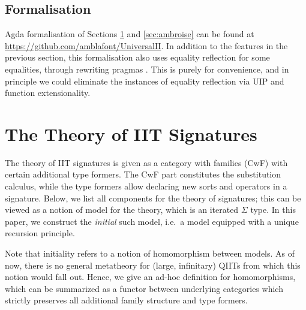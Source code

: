 \documentclass[a4paper,UKenglish,cleveref, autoref]{lipics-v2019}
\begin{document}
\subsection{Formalisation}

Agda formalisation of Sections \ref{sec:theory_of_signatures} and
\ref{sec:ambroise} can be found at
\url{https://github.com/amblafont/UniversalII}. In addition to the features in
the previous section, this formalisation also uses equality reflection for some
equalities, through rewriting pragmas \cite{cockxsprinkles}. This is purely for
convenience, and in principle we could eliminate the instances of equality
reflection via UIP and function extensionality.

\section{The Theory of IIT Signatures}
\label{sec:theory_of_signatures}

The theory of IIT signatures is given as a category with families
(CwF) \cite{Dybjer96internaltype} with certain additional type formers. The CwF
part constitutes the substitution calculus, while the type formers allow
declaring new sorts and operators in a signature. Below, we list all components
for the theory of signatures; this can be viewed as a notion of model for the
theory, which is an iterated $\Sigma$ type. In this paper, we construct the
\emph{initial} such model, i.e.\ a model equipped with a unique recursion principle.

Note that initiality refers to a notion of homomorphism between models. As
of now, there is no general metatheory for (large, infinitary) QIITs from which
this notion would fall out. Hence, we give an ad-hoc definition for
homomorphisms, which can be summarized as a functor between underlying
categories which strictly preserves all additional family structure and type
formers.
\end{document}
